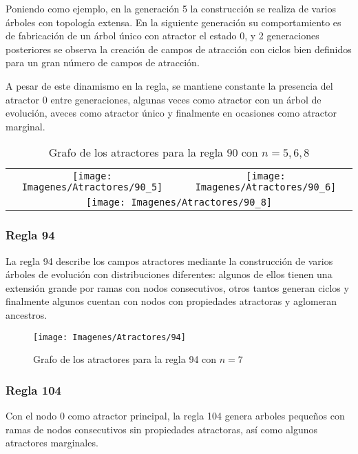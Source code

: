 \documentclass[]{article}
\begin{document}
				\hfill\break
				\justifying
				Poniendo como ejemplo, en la generación 5 la construcción se realiza de varios árboles con topología extensa. En la siguiente generación su comportamiento es de fabricación de un árbol único con atractor el estado 0, y 2 generaciones posteriores se observa la creación de campos de atracción con ciclos bien definidos para un gran número de campos de atracción.
				
				\hfill\break
				\justifying
				A pesar de este dinamismo en la regla, se mantiene constante la presencia del atractor 0 entre generaciones, algunas veces como atractor con un árbol de evolución, aveces como atractor único y finalmente en ocasiones como atractor marginal.
				
				\begin{table}[!h]
					\centering
					\begin{tabular}{c c}
						\texttt{[image: Imagenes/Atractores/90\_5]} & \texttt{[image: Imagenes/Atractores/90\_6]} \\
						\multicolumn{2}{c}{\texttt{[image: Imagenes/Atractores/90\_8]}}
					\end{tabular}
					\caption{Grafo de los atractores para la regla 90 con $n=5,6,8$}
					\label{Regla_90}
				\end{table}
			
			\newpage
			\subsubsection{Regla 94}
				\justifying
				La regla 94 describe los campos atractores mediante la construcción de varios árboles de evolución con distribuciones diferentes: algunos de ellos tienen una extensión grande por ramas con nodos consecutivos, otros tantos generan ciclos y finalmente algunos cuentan con nodos con propiedades atractoras y aglomeran ancestros.
				
				\hfill\break
				\hfill\break
				\begin{figure}[!h]
					\centering
					\texttt{[image: Imagenes/Atractores/94]}
					\caption{Grafo de los atractores para la regla 94 con $n=7$}
					\label{Regla_94}
				\end{figure}
			
			\newpage
			\subsubsection{Regla 104}
				\justifying
				Con el nodo 0 como atractor principal, la regla 104 genera arboles pequeños con ramas de nodos consecutivos sin propiedades atractoras, así como algunos atractores marginales.
				
\end{document}
